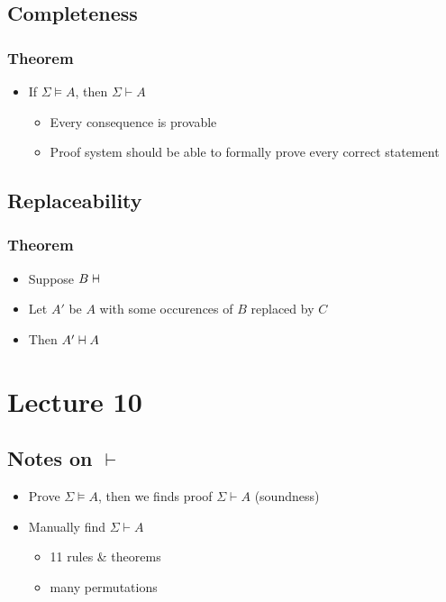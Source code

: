 \documentclass[11pt]{article}
\newcommand{\vdashv}{%
  \mathrel{%
    \text{%
      \ooalign{$\vdash$\cr\reflectbox{$\vdash$}\cr}%
    }%
  }%
}
\begin{document}
\subsection{Completeness}
\subsubsection{Theorem}
\begin{itemize}
    \item If $\Sigma\vDash A$, then $\Sigma\vdash A$
    \begin{itemize}
        \item Every consequence is provable
        \item Proof system should be able to formally prove every correct statement 
    \end{itemize}
\end{itemize}
\subsection{Replaceability}
\subsubsection{Theorem}
\begin{itemize}
    \item Suppose $B \vdashv$
    \item Let $A'$ be $A$ with some occurences of $B$ replaced by $C$
    \item Then $A'\vdashv A$
\end{itemize}

\section{Lecture 10}
\subsection{Notes on $\vdash$}
\begin{itemize}
    \item Prove $\Sigma\vDash A$, then we finds proof $\Sigma\vdash A$ (soundness)
    \item Manually find $\Sigma\vdash A$
    \begin{itemize}
        \item 11 rules \& theorems 
        \item many permutations 
    \end{itemize}
\end{itemize}
\end{document}
